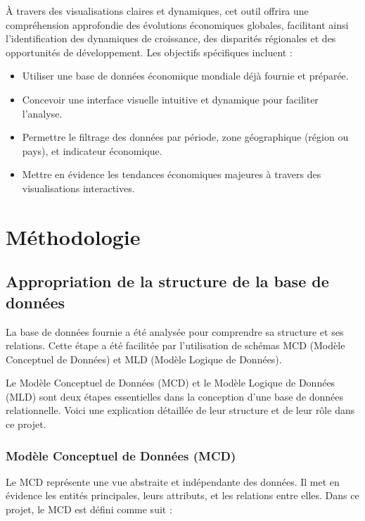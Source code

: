 \documentclass[11pt]{article}
\begin{document}
À travers des visualisations claires et dynamiques, cet outil offrira une compréhension approfondie des évolutions économiques globales, facilitant ainsi l’identification des dynamiques de croissance, des disparités régionales et des opportunités de développement. Les objectifs spécifiques incluent :

\begin{itemize}
  \item Utiliser une base de données économique mondiale déjà fournie et préparée.
  \item Concevoir une interface visuelle intuitive et dynamique pour faciliter l'analyse.
  \item Permettre le filtrage des données par période, zone géographique (région ou pays), et indicateur économique.
  \item Mettre en évidence les tendances économiques majeures à travers des visualisations interactives.
\end{itemize}

\pagebreak

\section{Méthodologie}

\subsection{Appropriation de la structure de la base de données}

La base de données fournie a été analysée pour comprendre sa structure et ses relations. Cette étape a été facilitée par l'utilisation de schémas MCD (Modèle Conceptuel de Données) et MLD (Modèle Logique de Données).


Le Modèle Conceptuel de Données (MCD) et le Modèle Logique de Données (MLD) sont deux étapes essentielles dans la conception d'une base de données relationnelle. Voici une explication détaillée de leur structure et de leur rôle dans ce projet.

\subsubsection*{Modèle Conceptuel de Données (MCD)}

Le MCD représente une vue abstraite et indépendante des données. Il met en évidence les entités principales, leurs attributs, et les relations entre elles. Dans ce projet, le MCD est défini comme suit :
\end{document}
